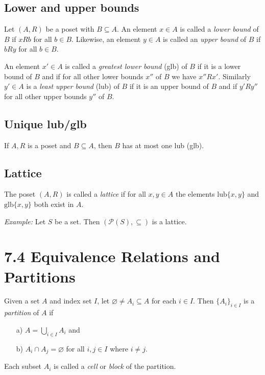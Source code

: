 \documentclass[11pt]{article}
\let\emptyset\varnothing
\begin{document}
    \subsection{Lower and upper bounds}

    Let \((A,R)\) be a poset with \(B \subseteq A\). An element \(x \in A\) is called a \emph{lower bound} of $B$ if \(xRb\) for all \(b \in B\). Likewise, an element \(y \in A\) is called an \emph{upper bound} of $B$ if \(bRy\) for all \(b \in B\).

    An element \(x' \in A\) is called a \emph{greatest lower bound} (glb) of $B$ if it is a lower bound of $B$ and if for all other lower bounds \(x''\) of $B$ we have \(x'' R x'\). Similarly \(y' \in A\) is a \emph{least upper bound} (lub) of $B$ if it is an upper bound of $B$ and if \(y' R y''\) for all other upper bounds \(y''\) of $B$.

    \subsection{Unique lub/glb}

    If \(A,R\) is a poset and \(B \subseteq A\), then $B$ has at most one lub (glb).

    \subsection{Lattice}

    The poset \((A,R)\) is called a \emph{lattice} if for all \(x,y \in A\) the elements \(\text{lub}\{x,y\}\) and \(\text{glb}\{x,y\}\) both exist in $A$.

    \vspace{1em}

    \emph{Example:} Let $S$ be a set. Then \((\mathcal{P}(S),\subseteq)\) is a lattice.

    \section{7.4 Equivalence Relations and Partitions}

    Given a set $A$ and index set $I$, let \(\emptyset \neq A_i \subseteq A\) for each \(i \in I\). Then \(\{A_i\}_{i \in I}\) is a \emph{partition} of $A$ if 
    \begin{enumerate}
        \item[a)] \(A = \bigcup_{i \in I} A_i\) and
        \item[b)] \(A_i \cap A_j = \emptyset\) for all \(i,j \in I\) where \(i \neq j\).
    \end{enumerate}
    Each subset \(A_i\) is called a \emph{cell} or \emph{block} of the partition.
\end{document}
